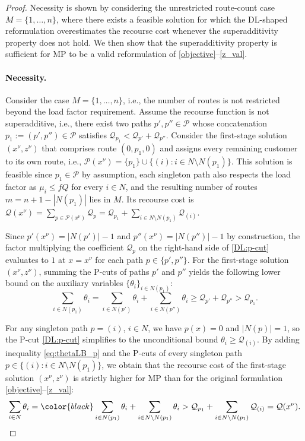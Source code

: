 \documentclass{article}
\newcommand{\rev}[1]{{\color{black}#1}}
\begin{document}
\begin{proof}
\rev{Necessity is shown by considering the unrestricted route-count case $M=\{1,\ldots,n\}$, where there exists a feasible solution for which the DL-shaped reformulation overestimates the recourse cost whenever the superadditivity property does not hold.} We then show that the superadditivity property is sufficient for MP to be a valid reformulation of \eqref{objective}--\eqref{z_val}.

\paragraph{\textcolor{black}{Necessity.}}\rev{Consider the case $M = \{1, \dots, n\}$, i.e., the number of routes is not restricted beyond the load factor requirement.} Assume the recourse function is not superadditive, i.e., there exist two paths \(p',p''\in\mathcal P\) whose concatenation \(p_1:=(p',p'')\in\mathcal P\) satisfies $\mathcal{Q}_{p_1} < \mathcal{Q}_{p'}+\mathcal{Q}_{p''}$. Consider the first-stage solution $(x^{\nu}, z^{\nu})$ \rev{that comprises route $(0, p_1, 0)$ and assigns every remaining customer to its own route, i.e., $\mathcal{P}(x^{\nu}) = \{p_1\}\cup \{(i) : i \in N\setminus N(p_1)\}$. This solution is feasible since $p_1 \in \mathcal{P}$ by assumption, each singleton path also respects the load factor as $\mu_i \leq fQ$ for every $i \in N$, and the resulting number of routes $m = n + 1 - |N(p_1)|$ lies in $M$. Its recourse cost is $\mathcal{Q}(x^{\nu}) = \sum_{p \in \mathcal{P}(x^{\nu})}\mathcal{Q}_p = \mathcal{Q}_{p_1} + \sum_{i\in N{\setminus}N(p_1)} \mathcal{Q}_{(i)}$.}

Since $p'(x^{\nu})=|N(p')|-1$ and $p''(x^{\nu})=|N(p'')|-1$ by construction, \rev{the factor multiplying the coefficient $\mathcal{Q}_p$ on the right-hand side of \eqref{DL:p-cut} evaluates to $1$ at $x=x^{\nu}$ for each path $p \in \{p', p''\}$. For the first-stage solution $(x^{\nu}, z^{\nu})$, summing the P-cuts of paths $p'$ and $p''$ yields the following lower bound on the auxiliary variables $\{\theta_i\}_{i \in N(p_1)}$:}
\begin{equation}\label{eq:thetaLB_p}
    \sum_{i\in N(p_1)}\theta_i
      = \sum_{i\in N(p')}\theta_i + \sum_{i\in N(p'')}\theta_i
      \geq \mathcal{Q}_{p'} + \mathcal{Q}_{p''} > \mathcal{Q}_{p_1}.
\end{equation}

\rev{For any singleton path $p = (i)$, $i \in N$, we have $p(x)=0$ and $|N(p)|=1$, so the P-cut \eqref{DL:p-cut} simplifies to the unconditional bound $\theta_i \geq \mathcal{Q}_{(i)}$. By adding inequality \eqref{eq:thetaLB_p} and the P-cuts of every singleton path $p \in \{(i) : i \in N\setminus N(p_1)\}$, we obtain that the recourse cost} of the first-stage solution $(x^{\nu},z^{\nu})$ is strictly higher for MP than for the original formulation \eqref{objective}--\eqref{z_val}:
\begin{equation*}
\sum_{i \in N} \theta_i = \rev{\sum_{i\in N(p_1)}\theta_i + \sum_{i\in N{\setminus}N(p_1)}\theta_i > \mathcal{Q}_{p_1} + \sum_{i\in N{\setminus}N(p_1)} \mathcal{Q}_{(i)}} = \mathcal{Q}(x^{\nu}).
\end{equation*}


\end{proof}
\end{document}
